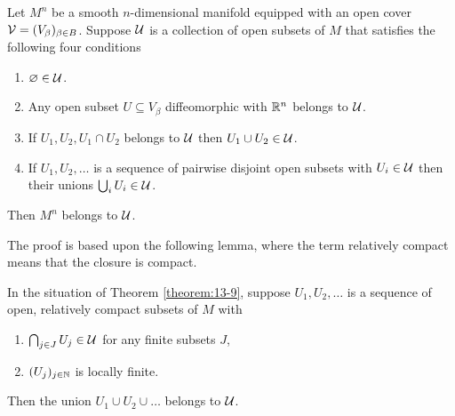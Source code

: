 \begin{theorem}\label{theorem:13-9}
  Let $M^n$ be a smooth $n$-dimensional manifold equipped with an open cover $\mathcal{V}=(V_\beta)_{\beta\in B}$. 
  Suppose $\mathcal{U}$ is a collection of open subsets of $M$ that satisfies the following four conditions
  \begin{enumerate}
    \item $\varnothing\in \mathcal{U}$.
    \item Any open subset $U\subseteq V_\beta$ diffeomorphic with ${\mathbb{R}}^n$ belongs to $\mathcal{U}$.
    \item If $U_1, U_2, U_1\cap U_2$ belongs to $\mathcal{U}$ then $U_1\cup U_2\in \mathcal{U}$.
    \item If $U_1, U_2,\ldots$ is a sequence of pairwise disjoint open subsets with $U_i\in \mathcal{U}$
      then their unions $\bigcup_i U_i\in\mathcal{U}$.
  \end{enumerate}
  Then $M^n$ belongs to $\mathcal{U}$.
\end{theorem}

The proof is based upon the following lemma, where the term relatively compact means that the closure is compact.

\begin{lemma}\label{lemma:13-10}
  In the situation of Theorem \ref{theorem:13-9}, suppose $U_1, U_2, \ldots$ is a sequence of open, relatively compact 
  subsets of $M$ with
  \begin{enumerate}
    \item $\bigcap_{j\in J} U_j\in\mathcal{U}$ for any finite subsets $J$,
    \item $(U_j)_{j\in{\ensuremath{\mathbb{N}}}}$ is locally finite.
  \end{enumerate}
  Then the union $U_1\cup U_2\cup\ldots$ belongs to $\mathcal{U}$.
\end{lemma}

